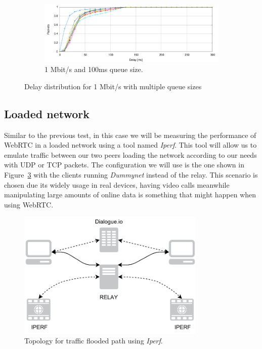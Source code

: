 \begin{figure}[htp]
        \begin{subfigure}[h]{1\textwidth}
                \centering
                \includegraphics[width=\textwidth]{./figures/1mb_01s_total_delay_distribution.pdf}
      \caption[1 Mbit/s and 100ms queue size]{1 Mbit/s and 100ms queue size.}
	\label{fig:1mb_01s_total_delay_distribution}
        \end{subfigure}
        \caption{Delay distribution for 1 Mbit/s with multiple queue sizes}
        \label{fig:1mb_total_delay_distribution}
\end{figure}

\clearpage
\clearpage
\subsection{Loaded network}

Similar to the previous test, in this case we will be measuring the performance of WebRTC in a loaded network using a tool named {\it Iperf}. This tool will allow us to emulate traffic between our two peers loading the network according to our needs with UDP or TCP packets. The configuration we will use is the one shown in Figure~\ref{fig:iperfTest} with the clients running {\it Dummynet} instead of the relay. This scenario is chosen due its widely usage in real devices, having video calls meanwhile manipulating large amounts of online data is something that might happen when using WebRTC.

 \begin{figure}[h]
  \centering
    \includegraphics[width=0.8\textwidth]{./figures/IPERF.pdf}
      \caption[Topology for traffic flooded path using {\it Iperf}]{Topology for traffic flooded path using {\it Iperf}.}
	\label{fig:iperfTest}
\end{figure}

